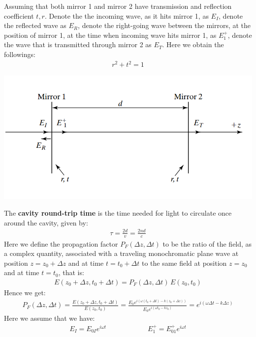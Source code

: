\documentclass[11pt]{book}
\theoremstyle{break}
\theoremstyle{break}
\begin{document}
Assuming that both mirror 1 and mirror 2 have transmission and reflection coefficient $t,r$. Denote the the incoming wave, as it hits mirror 1, as $E_I$, denote the reflected wave as $E_R$, denote the right-going wave between the mirrors, at the position of mirror 1, at the time when incoming wave hits mirror 1, as $E_1^+$, denote the wave that is transmitted through mirror 2 as $E_T$. Here we obtain the followings:
\begin{align*}
r^2 + t^2 = 1
\end{align*}
\begin{center}
\includegraphics[scale=0.55]{fbTrans.png}
\end{center}
The \textbf{cavity round-trip time} is the time needed for light to circulate once around the cavity, given by:
\begin{align*}
\tau = \frac{2d}{v} = \frac{2nd}{c}
\end{align*}
Here we define the propagation factor $P_F(\Delta z, \Delta t)$ to be the ratio of the field, as a complex quantity, associated with a traveling monochromatic plane wave at position $z = z_0 + \Delta z$ and at time $t = t_0 +\Delta t$ to the same field at position $z = z_0$ and at time $t = t_0$, that is:
\begin{align*}
E(z_0 + \Delta z, t_0+\Delta t) = P_F(\Delta z, \Delta t) \, E(z_0 ,t_0)
\end{align*}
Hence we get:
\begin{align}
P_F(\Delta z, \Delta t) = \frac{E(z_0 + \Delta z , t_0 + \Delta t)}{E(z_0, t_0)} = \frac{E_0 e^{i( \omega (t_0 + \Delta t) - k(z_0 + \Delta z))}}{E_0 e^{i(\omega t_0 - kz_0)}} = e^{i (\omega \Delta t - k\Delta z)}
\end{align}
Here we assume that we have:
\begin{align*}
E_I = E_{0I}e^{i\omega t} \qquad\qquad\qquad E_1^+ = E_{01}^+ e^{i\omega t}
\end{align*}
\end{document}
